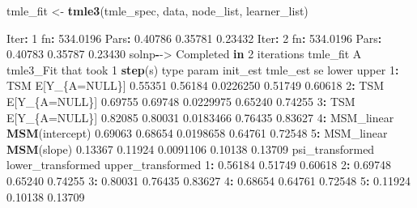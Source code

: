 \documentclass[12pt, krantz2,]{krantz}
\newenvironment{Shaded}{\begin{snugshade}}{\end{snugshade}}
\newcommand{\ControlFlowTok}[1]{\textcolor[rgb]{0.27,0.27,0.27}{\textbf{#1}}}
\newcommand{\DecValTok}[1]{\textcolor[rgb]{0.06,0.06,0.06}{#1}}
\newcommand{\FloatTok}[1]{\textcolor[rgb]{0.06,0.06,0.06}{#1}}
\newcommand{\KeywordTok}[1]{\textcolor[rgb]{0.27,0.27,0.27}{\textbf{#1}}}
\newcommand{\NormalTok}[1]{#1}
\newcommand{\OperatorTok}[1]{\textcolor[rgb]{0.43,0.43,0.43}{\textbf{#1}}}
\newcommand{\OtherTok}[1]{\textcolor[rgb]{0.37,0.37,0.37}{#1}}
\newcommand{\StringTok}[1]{\textcolor[rgb]{0.5,0.5,0.5}{#1}}
\theoremstyle{definition}
\theoremstyle{definition}
\theoremstyle{definition}
\newcommand{\1}{\mathbbm{1}}
\begin{document}
\begin{Shaded}
\begin{Highlighting}[]
\NormalTok{tmle_fit <-}\StringTok{ }\KeywordTok{tmle3}\NormalTok{(tmle_spec, data, node_list, learner_list)}

\NormalTok{Iter}\OperatorTok{:}\StringTok{ }\DecValTok{1}\NormalTok{ fn}\OperatorTok{:}\StringTok{ }\FloatTok{534.0196}\NormalTok{     Pars}\OperatorTok{:}\StringTok{  }\FloatTok{0.40786} \FloatTok{0.35781} \FloatTok{0.23432}
\NormalTok{Iter}\OperatorTok{:}\StringTok{ }\DecValTok{2}\NormalTok{ fn}\OperatorTok{:}\StringTok{ }\FloatTok{534.0196}\NormalTok{     Pars}\OperatorTok{:}\StringTok{  }\FloatTok{0.40783} \FloatTok{0.35787} \FloatTok{0.23430}
\NormalTok{solnp}\OperatorTok{-}\NormalTok{->}\StringTok{ }\NormalTok{Completed }\ControlFlowTok{in} \DecValTok{2}\NormalTok{ iterations}
\NormalTok{tmle_fit}
\NormalTok{A tmle3_Fit that took }\DecValTok{1} \KeywordTok{step}\NormalTok{(s)}
\NormalTok{         type          param init_est tmle_est        se   lower   upper}
\DecValTok{1}\OperatorTok{:}\StringTok{        }\NormalTok{TSM  E[Y_\{A=}\OtherTok{NULL}\NormalTok{\}]  }\FloatTok{0.55351}  \FloatTok{0.56184} \FloatTok{0.0226250} \FloatTok{0.51749} \FloatTok{0.60618}
\DecValTok{2}\OperatorTok{:}\StringTok{        }\NormalTok{TSM  E[Y_\{A=}\OtherTok{NULL}\NormalTok{\}]  }\FloatTok{0.69755}  \FloatTok{0.69748} \FloatTok{0.0229975} \FloatTok{0.65240} \FloatTok{0.74255}
\DecValTok{3}\OperatorTok{:}\StringTok{        }\NormalTok{TSM  E[Y_\{A=}\OtherTok{NULL}\NormalTok{\}]  }\FloatTok{0.82085}  \FloatTok{0.80031} \FloatTok{0.0183466} \FloatTok{0.76435} \FloatTok{0.83627}
\DecValTok{4}\OperatorTok{:}\StringTok{ }\NormalTok{MSM_linear }\KeywordTok{MSM}\NormalTok{(intercept)  }\FloatTok{0.69063}  \FloatTok{0.68654} \FloatTok{0.0198658} \FloatTok{0.64761} \FloatTok{0.72548}
\DecValTok{5}\OperatorTok{:}\StringTok{ }\NormalTok{MSM_linear     }\KeywordTok{MSM}\NormalTok{(slope)  }\FloatTok{0.13367}  \FloatTok{0.11924} \FloatTok{0.0091106} \FloatTok{0.10138} \FloatTok{0.13709}
\NormalTok{   psi_transformed lower_transformed upper_transformed}
\DecValTok{1}\OperatorTok{:}\StringTok{         }\FloatTok{0.56184}           \FloatTok{0.51749}           \FloatTok{0.60618}
\DecValTok{2}\OperatorTok{:}\StringTok{         }\FloatTok{0.69748}           \FloatTok{0.65240}           \FloatTok{0.74255}
\DecValTok{3}\OperatorTok{:}\StringTok{         }\FloatTok{0.80031}           \FloatTok{0.76435}           \FloatTok{0.83627}
\DecValTok{4}\OperatorTok{:}\StringTok{         }\FloatTok{0.68654}           \FloatTok{0.64761}           \FloatTok{0.72548}
\DecValTok{5}\OperatorTok{:}\StringTok{         }\FloatTok{0.11924}           \FloatTok{0.10138}           \FloatTok{0.13709}
\end{Highlighting}
\end{Shaded}
\end{document}
